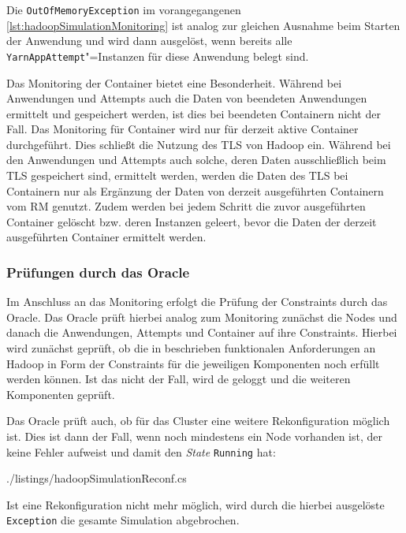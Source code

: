 Die \texttt{OutOfMemoryException} im vorangegangenen \autoref{lst:hadoopSimulationMonitoring} ist analog zur gleichen Ausnahme beim Starten der Anwendung und wird dann ausgelöst, wenn bereits alle \texttt{YarnAppAttempt}"=Instanzen für diese Anwendung belegt sind.

Das Monitoring der Container bietet eine Besonderheit.
Während bei Anwendungen und Attempts auch die Daten von beendeten Anwendungen ermittelt und gespeichert werden, ist dies bei beendeten Containern nicht der Fall.
Das Monitoring für Container wird nur für derzeit aktive Container durchgeführt.
Dies schließt die Nutzung des \ac{TLS} von Hadoop ein.
Während bei den Anwendungen und Attempts auch solche, deren Daten ausschließlich beim \ac{TLS} gespeichert sind, ermittelt werden, werden die Daten des \ac{TLS} bei Containern nur als Ergänzung der Daten von derzeit ausgeführten Containern vom \ac{RM} genutzt.
Zudem werden bei jedem Schritt die zuvor ausgeführten Container gelöscht bzw. deren Instanzen geleert, bevor die Daten der derzeit ausgeführten Container ermittelt werden.

\subsubsection{Prüfungen durch das Oracle}\label{sec:simulationOracle}

Im Anschluss an das Monitoring erfolgt die Prüfung der Constraints durch das Oracle.
Das Oracle prüft hierbei analog zum Monitoring zunächst die Nodes und danach die Anwendungen, Attempts und Container auf ihre Constraints.
Hierbei wird zunächst geprüft, ob die in  beschrieben funktionalen Anforderungen an Hadoop in Form der Constraints für die jeweiligen Komponenten noch erfüllt werden können.
Ist das nicht der Fall, wird de geloggt und die weiteren Komponenten geprüft.

Das Oracle prüft auch, ob für das Cluster eine weitere Rekonfiguration möglich ist.
Dies ist dann der Fall, wenn noch mindestens ein Node vorhanden ist, der keine Fehler aufweist und damit den \emph{State} \texttt{Running} hat:


{./listings/hadoopSimulationReconf.cs}

Ist eine Rekonfiguration nicht mehr möglich, wird durch die hierbei ausgelöste \texttt{Exception} die gesamte Simulation abgebrochen.

